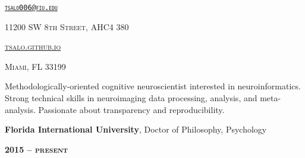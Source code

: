 \documentclass[10pt]{article}
\date{}
\newcommand{\namestyle}{\Huge \fontfamily{pcr}\selectfont}
\newcommand{\iconstyle}{\LARGE}
\newcommand{\headstyle}{\scshape \normalsize \textcolor{light-gray}}
\newcommand{\sectionstyle}{\LARGE \fontfamily{pcr}\selectfont}
\begin{document}
\begin{center}
	\namestyle{TAYLOR SALO}

	\bigskip

	\iconstyle{\href{https://github.com/tsalo}{\faGithubSquare}}
	\enspace
	\iconstyle{\href{https://www.researchgate.net/profile/Taylor_Salo}{}}
	\enspace
	\iconstyle{\href{https://scholar.google.com/citations?user=YbH1akIAAAAJ}{}}
	\enspace
	\iconstyle{\href{https://osf.io/iwpvm/}{}}
\end{center}

\begin{minipage}[t]{.5\linewidth}
\flushleft
\headstyle{\href{mailto:tsalo006@fiu.edu}{\nolinkurl{tsalo006@fiu.edu}}}
\end{minipage}
\hfill
\begin{minipage}[t]{.5\linewidth}
\flushright
\headstyle{11200 SW 8th Street, AHC4 380}
\end{minipage}

\begin{minipage}[t]{.3\linewidth}
\flushleft
\headstyle{\href{https://tsalo.github.io}{tsalo.github.io}}
\end{minipage}
\hfill
\begin{minipage}[t]{.7\linewidth}
\flushright
\headstyle{Miami, FL 33199}
\end{minipage}

\bigskip

\begin{center}\sectionstyle{PROFILE}\end{center}

Methodologically-oriented cognitive neuroscientist interested in
neuroinformatics. Strong technical skills in neuroimaging data
processing, analysis, and meta-analysis. Passionate about transparency
and reproducibility.

\bigskip

\begin{center}\sectionstyle{EDUCATION}\end{center}

\begin{minipage}[t]{.7\linewidth}
\flushleft
\noindent
\textbf{Florida International University}, Doctor of Philosophy,
Psychology
\end{minipage}
\hfill
\begin{minipage}[t]{.3\linewidth}
\flushright
\noindent
\textsc{\textbf{2015 -- present}}
\end{minipage}
\end{document}
